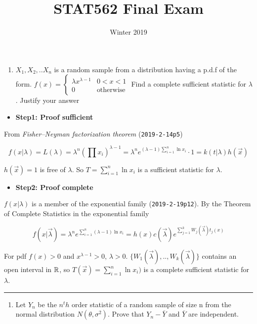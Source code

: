 \documentclass[12pt,]{article}
\title{STAT562 Final Exam}
\author{}
\date{Winter 2019}
\providecommand{\tightlist}{%
  \setlength{\itemsep}{0pt}\setlength{\parskip}{0pt}}
\begin{document}
\maketitle

\begin{enumerate}
\def\labelenumi{\arabic{enumi}.}
\tightlist
\item
  \textcolor[rgb]{0.5,0.5,0.5}{$X_1,X_2,..X_n$ is a random sample from a distribution having a p.d.f of the form.
  $f(x)=\begin{cases}\lambda x^{\lambda-1}&0<x<1\\0&\text{otherwise}\end{cases}$
  Find a complete sufficient statistic for $\lambda$. Justify your answer}
\end{enumerate}

\begin{itemize}
\tightlist
\item
  \textbf{Step1: Proof sufficient}
\end{itemize}

From \emph{Fisher--Neyman factorization theorem} (\texttt{2019-2-14p5})

\[f(x|\lambda)=L(\lambda)=\lambda^n(\prod x_i)^{\lambda-1}=\lambda^ne^{(\lambda-1)\sum^n_{i=1} \ln x_i}\cdot1=k(t|\lambda)h(\vec x)\]

\(h(\vec x)=1\) is free of \(\lambda\). So \(T=\sum^n_{i=1} \ln x_i\) is
a sufficient statistic for \(\lambda\).

\begin{itemize}
\tightlist
\item
  \textbf{Step2: Proof complete}
\end{itemize}

\(f(x|\lambda)\) is a member of the exponential family
(\texttt{2019-2-19p12}). By the Theorem of Complete Statistics in the
exponential family

\[f(x|\vec\lambda)=\lambda^ne^{\sum^n_{i=1} (\lambda-1)\ln x_i}=h(x)c(\vec \lambda)e^{\sum^k_{j=1}W_j(\vec \lambda)t_j(x)}\]

For pdf \(f(x)>0\) and \(x^{\lambda-1}>0\), \(\lambda>0\).
\(\{W_1(\vec \lambda),..,W_k(\vec \lambda)\}\) contains an open interval
in \(\Bbb R\), so \(T(\vec x)=\sum^n_{i=1} \ln x_i)\) is a complete
sufficient statistic for \(\lambda\).

\begin{center}\rule{0.5\linewidth}{\linethickness}\end{center}

\begin{enumerate}
\def\labelenumi{\arabic{enumi}.}
\setcounter{enumi}{1}
\tightlist
\item
  \textcolor[rgb]{0.5,0.5,0.5}{Let $Y_n$ be the $n^th$ order statistic of a random sample of size n from the normal distribution $N(\theta,\sigma^2)$. Prove that $Y_n-\bar Y$ and $\bar Y$ are independent.}
\end{enumerate}
\end{document}
